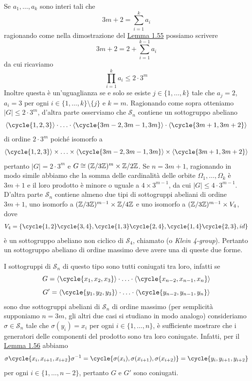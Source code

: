 \documentclass[11pt]{scrartcl}
\begin{document}
	\begin{remark}
		Se $a_1, \ldots, a_k$ sono interi tali che 
		\[
		3m + 2 = \sum_{i = 1}^k a_i
		\]
		ragionando come nella dimostrazione del \hyperref[lemma1.55]{Lemma 1.55}
		possiamo scrivere
		\[
		3m + 2 = 2 + \sum_{i = 1}^{k - 1}a_i
		\]
		da cui ricaviamo
		\[
		\prod_{i = 1}^k a_i \leqslant 2\cdot3^m
		\]
		Inoltre questa è un'uguaglianza se e solo se esiste $j \in \{1, \ldots, k\}$
		tale che $a_j = 2$, $a_i = 3$ per ogni $i \in \{1, \ldots, k\}\setminus\{j\}$
		e $k = m$. Ragionando come sopra otteniamo $|G| \leqslant 2\cdot 3^m$, 
		d'altra parte osserviamo che $\mathcal{S}_n$ contiene un sottogruppo abeliano
		\[
		\langle\cycle{1, 2, 3}\rangle\cdot\ldots\cdot\langle\cycle{3m - 2, 3m - 1, 3m}\rangle\cdot\langle\cycle{3m + 1, 3m + 2}\rangle
		\]
		di ordine $2\cdot3^m$ poiché isomorfo a 
		\[
		\langle\cycle{1, 2, 3}\rangle\times\ldots\times\langle\cycle{3m - 2, 3m - 1, 3m}\rangle\times\langle\cycle{3m + 1, 3m + 2}\rangle
		\]
		pertanto $|G| = 2\cdot3^m$ e $G \cong (\mathbb{Z}/{3}\mathbb{Z})^m \times \mathbb{Z}/{2}\mathbb{Z}$.
		Se $n = 3m + 1$, ragionando in modo simile abbiamo che la somma delle
		cardinalità delle orbite $\Omega_1, \ldots, \Omega_k$ è $3m + 1$ e il 
		loro prodotto è minore o uguale a $4\times 3^{m - 1}$, da cui $|G| \leq
		4\cdot3^{m - 1}$. D'altra parte $\mathcal{S}_n$ contiene almeno due tipi di 
		sottogruppi abeliani di ordine $3m + 1$, uno isomorfo a 
		$(\mathbb{Z}/{3}\mathbb{Z})^{m - 1} \times \mathbb{Z}/{4}\mathbb{Z}$ e uno isomorfo a $(\mathbb{Z}/{3}\mathbb{Z})^{m - 1}\times V_4$,
		dove 
		\[
		V_4 = \{\cycle{1, 2}\cycle{3, 4}, \cycle{1, 3}\cycle{2, 4}, 
		\cycle{1, 4}\cycle{2, 3}, id\}
		\]
		è un sottogruppo abeliano non ciclico di $\mathcal{S}_4$, chiamato 
		 (o \textit{Klein 4-group}). Pertanto un sottogruppo
		abeliano di ordine massimo deve avere una di queste due forme.
	\end{remark}
	
	\begin{remark}
		I sottogruppi di $\mathcal{S}_n$ di questo tipo sono tutti coniugati tra loro, infatti
		se 
		\[
		G = \langle\cycle{x_1, x_2, x_3}\rangle\cdot\ldots\cdot\langle\cycle{x_{n - 2}, x_{n - 1}, x_n}\rangle
		\]
		\[
		G' = \langle\cycle{y_1, y_2, y_3}\rangle\cdot\ldots\cdot\langle\cycle{y_{n - 2}, y_{n - 1}, y_n}\rangle
		\]
		sono due sottogruppi abeliani di $\mathcal{S}_n$ di ordine massimo (per semplicità
		supponiamo $n = 3m$, gli altri due casi si studiano in modo analogo)
		consideriamo $\sigma \in \mathcal{S}_n$ tale che $\sigma(y_i) = x_i$ per ogni 
		$i \in \{1, \ldots, n\}$, è sufficiente mostrare che i generatori delle componenti del
		prodotto sono tra loro coniugate. Infatti, per il \hyperref[lemma1.56]{Lemma 1.56}
		abbiamo 
		\[
		\sigma\cycle{x_i, x_{i + 1}, x_{i + 2}}\sigma^{-1} = 
		\cycle{\sigma(x_i), \sigma(x_{i + 1}), \sigma(x_{i + 2})} = 
		\cycle{y_i, y_{i + 1}, y_{i + 2}}
		\]
		per ogni $i \in \{1, \ldots, n - 2\}$, pertanto $G$ e $G'$ sono coniugati.
	\end{remark}
	
\end{document}
